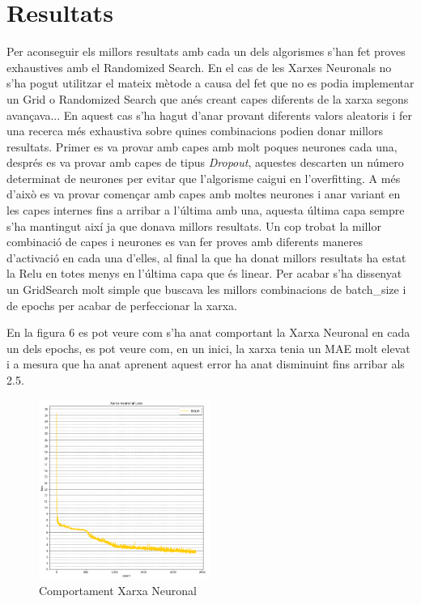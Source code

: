 \documentclass[10pt,a4paper,twocolumn,twoside]{article}
\begin{document}
\section{Resultats}
Per aconseguir els millors resultats amb cada un dels algorismes s'han fet proves exhaustives amb el Randomized Search. En el cas de les Xarxes Neuronals no s'ha pogut utilitzar el mateix mètode a causa del fet que no es podia implementar un Grid o Randomized Search que anés creant capes diferents de la xarxa segons avançava... En aquest cas s'ha hagut d'anar provant diferents valors aleatoris i fer una recerca més exhaustiva sobre quines combinacions podien donar millors resultats. Primer es va provar amb capes amb molt poques neurones cada una, després es va provar amb capes de tipus \textit{Dropout}, aquestes descarten un número determinat de neurones per evitar que l'algorisme caigui en l'overfitting. A més d'això es va provar començar amb capes amb moltes neurones i anar variant en les capes internes fins a arribar a l'última amb una, aquesta última capa sempre s'ha mantingut així ja que donava millors resultats. Un cop trobat la millor combinació de capes i neurones es van fer proves amb diferents maneres d'activació en cada una d'elles, al final la que ha donat millors resultats ha estat la Relu en totes menys en l'última capa que és linear. Per acabar s'ha dissenyat un GridSearch molt simple que buscava les millors combinacions de batch\_size i de epochs per acabar de perfeccionar la xarxa. 

En la figura 6 es pot veure com s'ha anat comportant la Xarxa Neuronal en cada un dels epochs, es pot veure com, en un inici, la xarxa tenia un MAE molt elevat i a mesura que ha anat aprenent aquest error ha anat disminuint fins arribar als 2.5.
\begin{figure}[!h]
\centering
	\includegraphics[width=0.5\textwidth]{../img/analisiNN}
	\caption{Comportament Xarxa Neuronal}
	\label{fig-analisiNN}
\end{figure}
\end{document}
